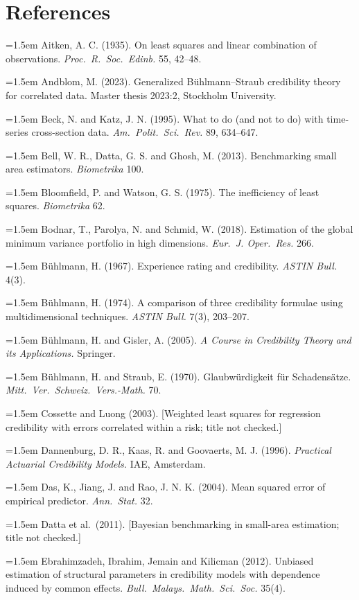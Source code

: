 \section*{References}
\label{sec:references}
\begingroup\small\setlength{\parindent}{0pt}\setlength{\parskip}{2pt}
\newcommand{\bib}[1]{\par\hangindent=1.5em #1}
\bib{Aitken, A. C. (1935). On least squares and linear combination of observations. \emph{Proc.\ R.\ Soc.\ Edinb.} 55, 42--48.}
\bib{Andblom, M. (2023). Generalized Bühlmann--Straub credibility theory for correlated data. Master thesis 2023:2, Stockholm University.}
\bib{Beck, N. and Katz, J. N. (1995). What to do (and not to do) with time-series cross-section data. \emph{Am.\ Polit.\ Sci.\ Rev.} 89, 634--647.}
\bib{Bell, W. R., Datta, G. S. and Ghosh, M. (2013). Benchmarking small area estimators. \emph{Biometrika} 100.}
\bib{Bloomfield, P. and Watson, G. S. (1975). The inefficiency of least squares. \emph{Biometrika} 62.}
\bib{Bodnar, T., Parolya, N. and Schmid, W. (2018). Estimation of the global minimum variance portfolio in high dimensions. \emph{Eur.\ J. Oper.\ Res.} 266.}
\bib{Bühlmann, H. (1967). Experience rating and credibility. \emph{ASTIN Bull.} 4(3).}
\bib{Bühlmann, H. (1974). A comparison of three credibility formulae using multidimensional techniques. \emph{ASTIN Bull.} 7(3), 203--207.}
\bib{Bühlmann, H. and Gisler, A. (2005). \emph{A Course in Credibility Theory and its Applications.} Springer.}
\bib{Bühlmann, H. and Straub, E. (1970). Glaubwürdigkeit für Schadensätze. \emph{Mitt.\ Ver.\ Schweiz.\ Vers.-Math.} 70.}
\bib{Cossette and Luong (2003). [Weighted least squares for regression credibility with errors correlated within a risk; title not checked.]}
\bib{Dannenburg, D. R., Kaas, R. and Goovaerts, M. J. (1996). \emph{Practical Actuarial Credibility Models.} IAE, Amsterdam.}
\bib{Das, K., Jiang, J. and Rao, J. N. K. (2004). Mean squared error of empirical predictor. \emph{Ann.\ Stat.} 32.}
\bib{Datta et al.\ (2011). [Bayesian benchmarking in small-area estimation; title not checked.]}
\bib{Ebrahimzadeh, Ibrahim, Jemain and Kilicman (2012). Unbiased estimation of structural parameters in credibility models with dependence induced by common effects. \emph{Bull.\ Malays.\ Math.\ Sci.\ Soc.} 35(4).}
